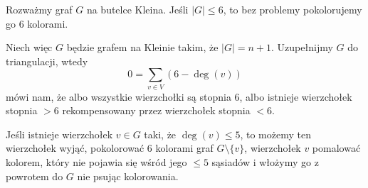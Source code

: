 \begin{enumerate}[label=\textbf{(\alph*)}]
%
%
%
%      
%
%
%


  Rozważmy graf $G$ na butelce Kleina. Jeśli $|G|\leq 6$, to bez problemy pokolorujemy go $6$ kolorami.

  Niech więc $G$ będzie grafem na Kleinie takim, że $|G|=n+1$. Uzupełnijmy $G$ do triangulacji, wtedy
  $$0=\sum_{v\in V}(6-\deg(v))$$
  mówi nam, że albo wszystkie wierzchołki są stopnia $6$, albo istnieje wierzchołek stopnia $>6$ rekompensowany przez wierzchołek stopnia $<6$.

  Jeśli istnieje wierzchołek $v\in G$ taki, że $\deg(v)\leq 5$, to możemy ten wierzchołek wyjąć, pokolorować $6$ kolorami graf $G\setminus \{v\}$, wierzchołek $v$ pomalować kolorem, który nie pojawia się wśród jego $\leq 5$ sąsiadów i włożymy go z powrotem do $G$ nie psując kolorowania.


\end{enumerate}
